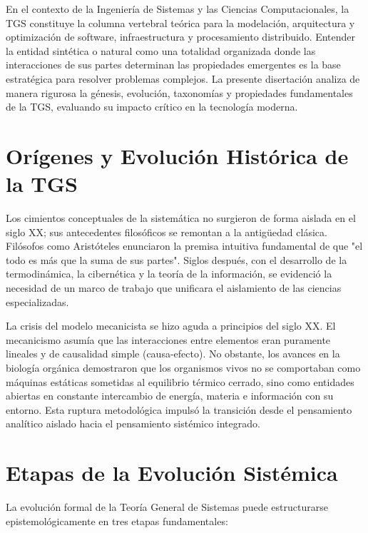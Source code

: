 \documentclass[12pt,letterpaper]{article}
\begin{document}
En el contexto de la Ingeniería de Sistemas y las Ciencias Computacionales, la TGS constituye la columna vertebral teórica para la modelación, arquitectura y optimización de software, infraestructura y procesamiento distribuido. Entender la entidad sintética o natural como una totalidad organizada donde las interacciones de sus partes determinan las propiedades emergentes es la base estratégica para resolver problemas complejos. La presente disertación analiza de manera rigurosa la génesis, evolución, taxonomías y propiedades fundamentales de la TGS, evaluando su impacto crítico en la tecnología moderna.
\newpage
\section*{Orígenes y Evolución Histórica de la TGS}

Los cimientos conceptuales de la sistemática no surgieron de forma aislada en el siglo XX; sus antecedentes filosóficos se remontan a la antigüedad clásica. Filósofos como Aristóteles enunciaron la premisa intuitiva fundamental de que "el todo es más que la suma de sus partes". Siglos después, con el desarrollo de la termodinámica, la cibernética y la teoría de la información, se evidenció la necesidad de un marco de trabajo que unificara el aislamiento de las ciencias especializadas. 

La crisis del modelo mecanicista se hizo aguda a principios del siglo XX. El mecanicismo asumía que las interacciones entre elementos eran puramente lineales y de causalidad simple (causa-efecto). No obstante, los avances en la biología orgánica demostraron que los organismos vivos no se comportaban como máquinas estáticas sometidas al equilibrio térmico cerrado, sino como entidades abiertas en constante intercambio de energía, materia e información con su entorno. Esta ruptura metodológica impulsó la transición desde el pensamiento analítico aislado hacia el pensamiento sistémico integrado.

\section*{Etapas de la Evolución Sistémica}

La evolución formal de la Teoría General de Sistemas puede estructurarse epistemológicamente en tres etapas fundamentales:
\end{document}
